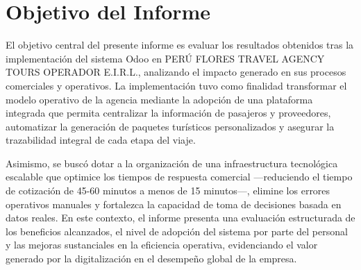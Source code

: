 \section{Objetivo del Informe}

El objetivo central del presente informe es evaluar los resultados obtenidos tras la implementación del sistema Odoo en PERÚ FLORES TRAVEL AGENCY TOURS OPERADOR E.I.R.L., analizando el impacto generado en sus procesos comerciales y operativos. La implementación tuvo como finalidad transformar el modelo operativo de la agencia mediante la adopción de una plataforma integrada que permita centralizar la información de pasajeros y proveedores, automatizar la generación de paquetes turísticos personalizados y asegurar la trazabilidad integral de cada etapa del viaje.

Asimismo, se buscó dotar a la organización de una infraestructura tecnológica escalable que optimice los tiempos de respuesta comercial ---reduciendo el tiempo de cotización de 45-60 minutos a menos de 15 minutos---, elimine los errores operativos manuales y fortalezca la capacidad de toma de decisiones basada en datos reales. En este contexto, el informe presenta una evaluación estructurada de los beneficios alcanzados, el nivel de adopción del sistema por parte del personal y las mejoras sustanciales en la eficiencia operativa, evidenciando el valor generado por la digitalización en el desempeño global de la empresa.
